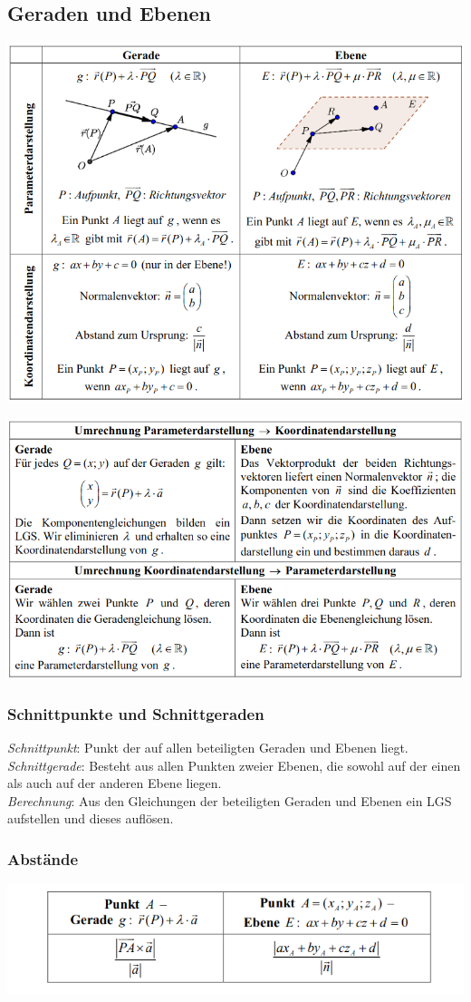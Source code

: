 \subsection{Geraden und Ebenen}
\begin{center}
  \includegraphics[width=0.9\linewidth]{images/geraden1.png}
\end{center}
\begin{center}
  \includegraphics[width=0.9\linewidth]{images/geraden2.png}
\end{center}

\subsubsection{Schnittpunkte und Schnittgeraden}%
\label{ssub:Schnittpunkte und Schnittgeraden}
\textit{Schnittpunkt}: Punkt der auf allen beteiligten Geraden und Ebenen liegt. \\
\textit{Schnittgerade}: Besteht aus allen Punkten zweier Ebenen, die sowohl auf der einen als auch auf der anderen Ebene liegen. \\
\textit{Berechnung}: Aus den Gleichungen der beteiligten Geraden und Ebenen ein LGS aufstellen und dieses auflösen.

\subsubsection{Abstände}%
\label{ssub:Abstände}
\begin{center}
  \includegraphics[width=0.7\linewidth]{images/abstand.png}
\end{center}
\vfill
